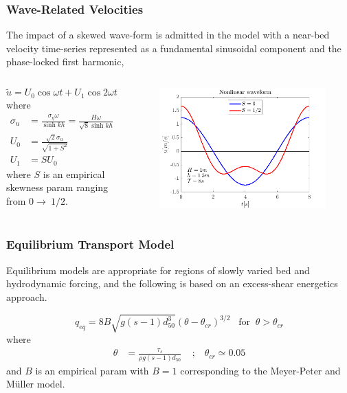 \documentclass[aspectratio=169]{beamer}
\begin{document}
\begin{frame}
  \frametitle{Wave-Related Velocities}
  The impact of a skewed wave-form is admitted in the model with a 
  near-bed velocity time-series represented as a fundamental sinusoidal component and the phase-locked first harmonic, 

  \begin{columns}[c] %
    
\begin{equation*}
\tilde{u} = U_0 \cos{\omega t}+ U_1 \cos{2 \omega t}
\end{equation*}
  where
 \begin{align*}
   \sigma_u &= \frac{\sigma_{\eta} \omega}{ \sinh{kh}} = \frac{H \omega}{\sqrt{8} \sinh{kh}}\\
   U_0 &= \frac{ \sqrt{2} \sigma_u}{\sqrt{1+S^2}}\\
   U_1 &= S U_0
 \end{align*}
 where $S$ is an empirical skewness param ranging from $0 \rightarrow ~1/2$.
 \begin{figure}
   \includegraphics[width=1\linewidth]{./skewness.png}
 \end{figure}
  \end{columns} 
 \end{frame}
\begin{frame}
  \frametitle{Equilibrium Transport Model}

  Equilibrium models are appropriate for regions of slowly varied bed
  and hydrodynamic forcing, and the following is based on an
  excess-shear energetics approach.

\begin{equation*}
  q_{eq} = 8 B \sqrt{g (s-1) d_{50}^3}(\theta-\theta_{cr})^{3/2} \;\;\; \mbox{for} \;\; \theta>\theta_{cr}
\end{equation*}
where
\begin{align*}
  \theta &= \frac{\tau_s}{\rho g (s-1) d_{50}} \;\;\;\; ; \;\;\;  \theta_{cr} \simeq 0.05
\end{align*}
and $B$ is an empirical param with $B=1$ corresponding to the
Meyer-Peter and Müller model.

\end{frame}
\end{document}
